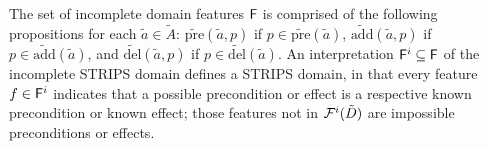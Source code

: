 \documentclass{article}
\newtheorem{definition}[theorem]{Definition}
\newenvironment{packed_itemize}{
\begin{itemize}
  \setlength{\itemsep}{1pt}
  \setlength{\parskip}{0pt}
  \setlength{\parsep}{0pt}
}{\end{itemize}}
\begin{document}
The set of incomplete domain features ${\sf F}$ is comprised of the
following propositions for each $\tilde{a} \in \tilde{A}$:
 $\widetilde{\text{pre}}(\tilde{a}, p)$ if $p \in
 \widetilde{\text{pre}}(\tilde{a})$, $\widetilde{\text{add}}(\tilde{a}, p)$ if
 $p \in \widetilde{\text{add}}(\tilde{a})$, and
 $\widetilde{\text{del}}(\tilde{a}, p)$ if $p \in
 \widetilde{\text{del}}(\tilde{a})$.
An interpretation ${\sf F}^i \subseteq {\sf F}$ of the
incomplete STRIPS domain defines a STRIPS domain, in that every feature $f \in
{\sf F}^i$ indicates that a possible precondition or effect is a
respective known precondition or known effect; those features not in ${\cal
F}^i(\tilde{D})$ are impossible preconditions or effects.
\end{document}
